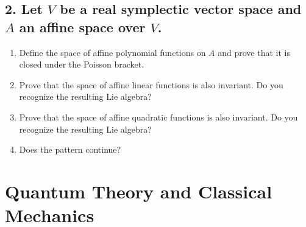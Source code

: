 \subsection*{2. Let $V$ be a real symplectic vector space and $A$ an affine space over $V$.}

\begin{enumerate}
    \item[(a)] Define the space of affine polynomial functions on $A$ and prove that it is closed under the Poisson bracket.

    \item[(b)] Prove that the space of affine linear functions is also invariant. Do you recognize the resulting Lie algebra?

    \item[(c)] Prove that the space of affine quadratic functions is also invariant. Do you recognize the resulting Lie algebra?

    \item[(d)] Does the pattern continue?
\end{enumerate}

\newpage

\section*{Quantum Theory and Classical Mechanics}

